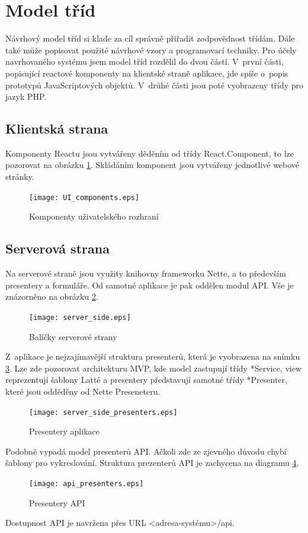 \documentclass[thesis=B,czech]{FITthesis}[2012/06/26]
\begin{document}
\section{Model tříd}
	Návrhový model tříd si klade za cíl správně přiřadit zodpovědnost třídám. Dále také může popisovat použité návrhové vzory a programovací techniky.\cite{si1_pred6} Pro účely navrhovaného systému jsem model tříd rozdělil do dvou částí. V~první části, popisující reactové komponenty na klientské straně aplikace, jde spíše o~popis prototypů JavaScriptových objektů. V~drůhé části jsou poté vyobrazeny třídy pro jazyk PHP.
	
\subsection{Klientská strana}
	Komponenty Reactu jsou vytvářeny děděním od třídy React.Component, to lze pozorovat na obrázku \ref{ui_komponents}. Skládáním komponent jsou vytvářeny jednotlivé webové stránky.
	
\begin{figure}
	\texttt{[image: UI\_components.eps]}
	\caption{Komponenty uživatelského rozhraní}\label{ui_komponents}
\end{figure}

\subsection{Serverová strana}
	Na serverové straně jsou využity knihovny frameworku Nette, a to především presentery a formuláře. Od samotné aplikace je pak oddělen modul API. Vše je znázorněno na obrázku \ref{server_side}.
	
\begin{figure}
	\texttt{[image: server\_side.eps]}
	\caption{Balíčky serverové strany}\label{server_side}
\end{figure}

	Z~aplikace je nejzajímavější struktura presenterů, která je vyobrazena na snímku \ref{server_side_presenters}. Lze zde pozorovat architekturu MVP, kde model zastupují třídy *Service, view reprezentují šablony Latté a presentery představují samotné třídy *Presenter, které jsou odděděny od Nette Preseneteru.

\begin{figure}
	\texttt{[image: server\_side\_presenters.eps]}
	\caption{Presentery aplikace}\label{server_side_presenters}
\end{figure}	
	
	Podobně vypadá model presenterů API. Ačkoli zde ze zjevného důvodu chybí šablony pro vykreslování. Struktura prezenterů API je zachycena na diagramu \ref{api_presenters}.
\begin{figure}
	\texttt{[image: api\_presenters.eps]}
	\caption{Presentery API}\label{api_presenters}
\end{figure}
	Dostupnost API je navržena přes URL <adresa-systému>/api.
\end{document}

